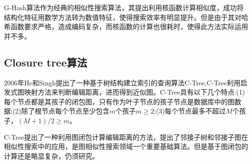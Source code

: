 \documentclass{XDBAthesis}
\begin{document}
G-Hash算法作为经典的相似性搜索算法，其提出利用核函数计算相似度，成功将结构化特征用数学方法转为数值特征，使得搜索效率有明显提升。但是由于其对哈希函数要求严格，造成编码复杂，而核函数的计算也很耗时，使得此方法实际运用并不多。

\subsection{Closure tree算法}
2006年He和Singh提出了一种基于树结构建立索引的查询算法C-Tree\cite{C-Tree},C-Tree利用启发式图映射方法来判断编辑距离，进而得到近似图。C-Tree具有以下几个特点\cite{DTS}:(1)每个节点都是其孩子的闭包图，只有作为叶子节点的孩子节点是数据库中的图数据;(2)除了根节点每个节点至少包含$m$个孩子$m\geq 2$;(3)每个节点最多不超过$M$个孩子，$(M+1)/2\geq m$。

C-Tree提出了一种利用图闭包计算编辑距离的方法，提出了邻接子树和邻接子图在相似性搜索中的应用，是图相似性搜索领域一个重要基础算法。但是基于图闭包的计算还是略显复杂，仍须研究。

\ifx\allfiles\undefined


\end{document}
